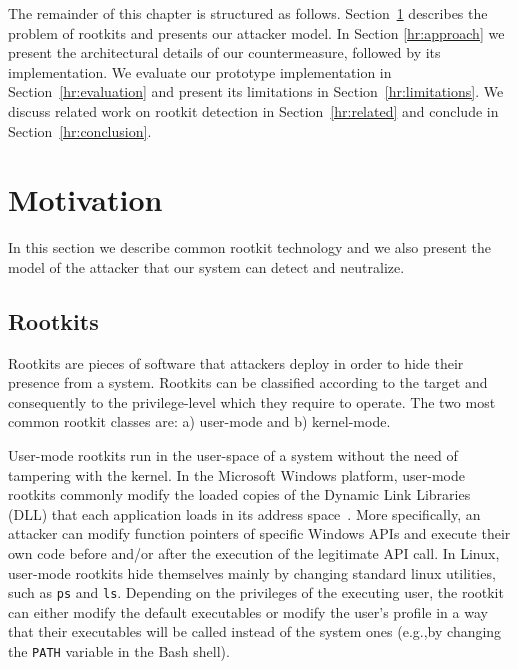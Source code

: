 
The remainder of this chapter is structured as follows. Section~\ref{hr:motivation} describes the problem of rootkits and presents our attacker model. In Section \ref{hr:approach} we present the architectural details of our countermeasure, followed by its implementation.
We evaluate our prototype implementation in Section~\ref{hr:evaluation} and present its limitations in Section~\ref{hr:limitations}. We discuss related work on rootkit detection in Section~\ref{hr:related} and conclude in Section~\ref{hr:conclusion}.

\section{Motivation}\label{hr:motivation}
In this section we describe common rootkit technology and we also present the model of the attacker that our system can detect and neutralize.

\subsection{Rootkits}
Rootkits are pieces of software that attackers deploy in order to hide their presence from a system. Rootkits can be classified according to the target and consequently to the privilege-level which they require to operate. The two most common rootkit classes are: a) user-mode and b) kernel-mode.

User-mode rootkits run in the user-space of a system without the need of tampering with the kernel. In the Microsoft Windows platform, user-mode rootkits commonly modify the loaded copies of the Dynamic Link Libraries (DLL) that each application loads in its address space~\cite{SymantecRootkits}. 
More specifically, an attacker can modify function pointers of specific Windows APIs and execute their own code before and/or after the execution of the legitimate API call. In Linux, user-mode rootkits hide themselves mainly by changing standard linux utilities, such as \texttt{ps} and \texttt{ls}. Depending on the privileges of the executing user, the rootkit can either modify the default executables or modify the user's profile in a way that their executables will be called instead of the system ones (e.g.,by changing the \texttt{PATH} variable in the Bash shell).

